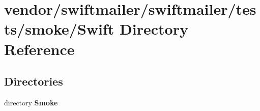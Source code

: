 \section{vendor/swiftmailer/swiftmailer/tests/smoke/\+Swift Directory Reference}
\label{dir_3ecaaf3567256fffb826f7136316364e}
\subsection*{Directories}
\begin{DoxyCompactItemize}
\item 
directory {\bf Smoke}
\end{DoxyCompactItemize}
